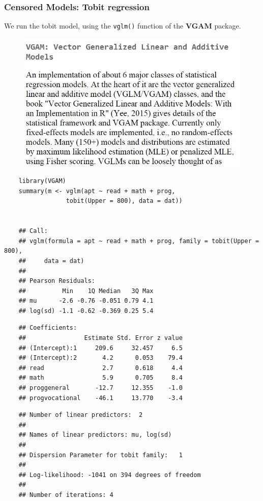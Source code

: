 \documentclass{beamer}
\begin{document}
\begin{frame}[fragile]
\frametitle{Censored Models: Tobit regression}
\large
We run the tobit model, using the \texttt{vglm()} function of the \textbf{VGAM} package.
	\begin{figure}
\centering
\includegraphics[width=0.7\linewidth]{images/cran-Vgam}
\end{figure}

\end{frame}

\begin{frame}[fragile]
	\large
	\begin{verbatim}
	library(VGAM)
	summary(m <- vglm(apt ~ read + math + prog, 
	             tobit(Upper = 800), data = dat))


	## Call:
	## vglm(formula = apt ~ read + math + prog, family = tobit(Upper = 800), 
	##     data = dat)
	## 
	## Pearson Residuals:
	##          Min    1Q Median   3Q Max
	## mu      -2.6 -0.76 -0.051 0.79 4.1
	## log(sd) -1.1 -0.62 -0.369 0.25 5.4
\end{verbatim}
\end{frame}
\begin{frame}[fragile]
	\large
\begin{verbatim}
	## Coefficients:
	##                Estimate Std. Error z value
	## (Intercept):1     209.6     32.457     6.5
	## (Intercept):2       4.2      0.053    79.4
	## read                2.7      0.618     4.4
	## math                5.9      0.705     8.4
	## proggeneral       -12.7     12.355    -1.0
	## progvocational    -46.1     13.770    -3.4
\end{verbatim}
\end{frame}
\begin{frame}[fragile]
	\large
	\begin{verbatim}
	## Number of linear predictors:  2 
	## 
	## Names of linear predictors: mu, log(sd)
	## 
	## Dispersion Parameter for tobit family:   1
	## 
	## Log-likelihood: -1041 on 394 degrees of freedom
	## 
	## Number of iterations: 4
\end{verbatim}
\end{frame}
\end{document}
